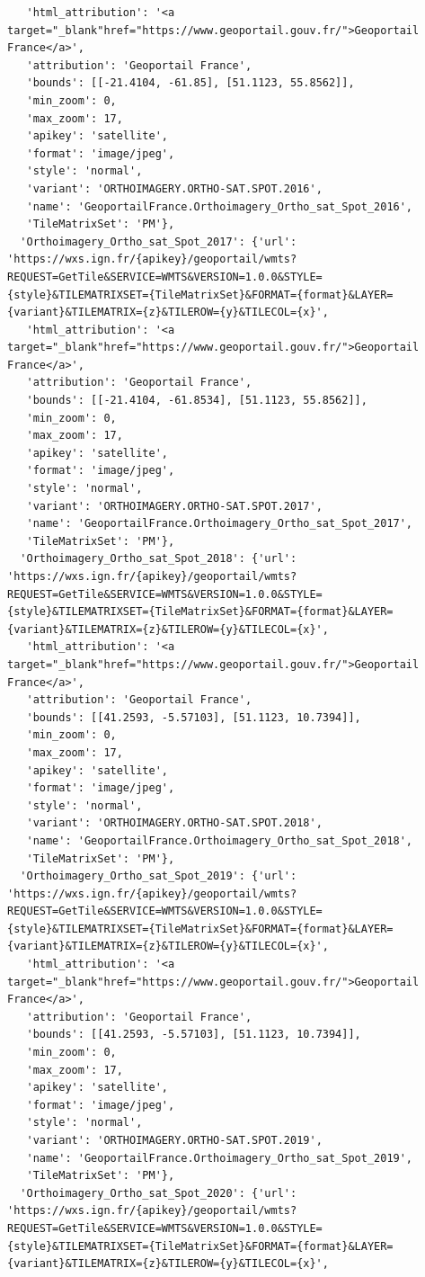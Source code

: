 \documentclass[
  letterpaper,
  DIV=11,
  numbers=noendperiod]{scrreprt}
\begin{document}
\begin{verbatim}
   'html_attribution': '<a target="_blank"href="https://www.geoportail.gouv.fr/">Geoportail France</a>',
   'attribution': 'Geoportail France',
   'bounds': [[-21.4104, -61.85], [51.1123, 55.8562]],
   'min_zoom': 0,
   'max_zoom': 17,
   'apikey': 'satellite',
   'format': 'image/jpeg',
   'style': 'normal',
   'variant': 'ORTHOIMAGERY.ORTHO-SAT.SPOT.2016',
   'name': 'GeoportailFrance.Orthoimagery_Ortho_sat_Spot_2016',
   'TileMatrixSet': 'PM'},
  'Orthoimagery_Ortho_sat_Spot_2017': {'url': 'https://wxs.ign.fr/{apikey}/geoportail/wmts?REQUEST=GetTile&SERVICE=WMTS&VERSION=1.0.0&STYLE={style}&TILEMATRIXSET={TileMatrixSet}&FORMAT={format}&LAYER={variant}&TILEMATRIX={z}&TILEROW={y}&TILECOL={x}',
   'html_attribution': '<a target="_blank"href="https://www.geoportail.gouv.fr/">Geoportail France</a>',
   'attribution': 'Geoportail France',
   'bounds': [[-21.4104, -61.8534], [51.1123, 55.8562]],
   'min_zoom': 0,
   'max_zoom': 17,
   'apikey': 'satellite',
   'format': 'image/jpeg',
   'style': 'normal',
   'variant': 'ORTHOIMAGERY.ORTHO-SAT.SPOT.2017',
   'name': 'GeoportailFrance.Orthoimagery_Ortho_sat_Spot_2017',
   'TileMatrixSet': 'PM'},
  'Orthoimagery_Ortho_sat_Spot_2018': {'url': 'https://wxs.ign.fr/{apikey}/geoportail/wmts?REQUEST=GetTile&SERVICE=WMTS&VERSION=1.0.0&STYLE={style}&TILEMATRIXSET={TileMatrixSet}&FORMAT={format}&LAYER={variant}&TILEMATRIX={z}&TILEROW={y}&TILECOL={x}',
   'html_attribution': '<a target="_blank"href="https://www.geoportail.gouv.fr/">Geoportail France</a>',
   'attribution': 'Geoportail France',
   'bounds': [[41.2593, -5.57103], [51.1123, 10.7394]],
   'min_zoom': 0,
   'max_zoom': 17,
   'apikey': 'satellite',
   'format': 'image/jpeg',
   'style': 'normal',
   'variant': 'ORTHOIMAGERY.ORTHO-SAT.SPOT.2018',
   'name': 'GeoportailFrance.Orthoimagery_Ortho_sat_Spot_2018',
   'TileMatrixSet': 'PM'},
  'Orthoimagery_Ortho_sat_Spot_2019': {'url': 'https://wxs.ign.fr/{apikey}/geoportail/wmts?REQUEST=GetTile&SERVICE=WMTS&VERSION=1.0.0&STYLE={style}&TILEMATRIXSET={TileMatrixSet}&FORMAT={format}&LAYER={variant}&TILEMATRIX={z}&TILEROW={y}&TILECOL={x}',
   'html_attribution': '<a target="_blank"href="https://www.geoportail.gouv.fr/">Geoportail France</a>',
   'attribution': 'Geoportail France',
   'bounds': [[41.2593, -5.57103], [51.1123, 10.7394]],
   'min_zoom': 0,
   'max_zoom': 17,
   'apikey': 'satellite',
   'format': 'image/jpeg',
   'style': 'normal',
   'variant': 'ORTHOIMAGERY.ORTHO-SAT.SPOT.2019',
   'name': 'GeoportailFrance.Orthoimagery_Ortho_sat_Spot_2019',
   'TileMatrixSet': 'PM'},
  'Orthoimagery_Ortho_sat_Spot_2020': {'url': 'https://wxs.ign.fr/{apikey}/geoportail/wmts?REQUEST=GetTile&SERVICE=WMTS&VERSION=1.0.0&STYLE={style}&TILEMATRIXSET={TileMatrixSet}&FORMAT={format}&LAYER={variant}&TILEMATRIX={z}&TILEROW={y}&TILECOL={x}',

\end{verbatim}
\end{document}
